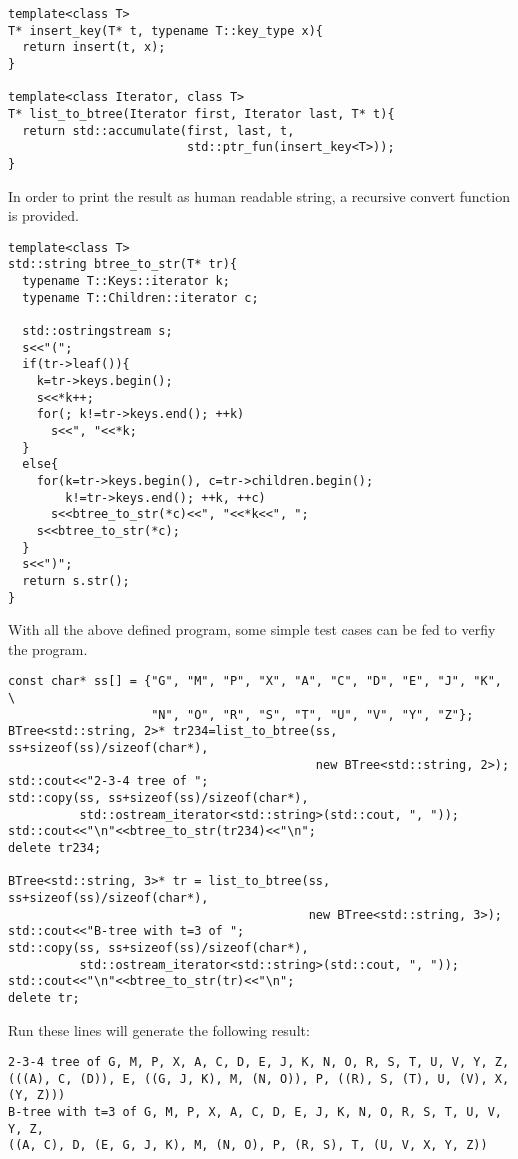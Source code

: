 \documentclass{article}
\begin{document}
\begin{lstlisting}
template<class T>
T* insert_key(T* t, typename T::key_type x){
  return insert(t, x);
}

template<class Iterator, class T>
T* list_to_btree(Iterator first, Iterator last, T* t){
  return std::accumulate(first, last, t,
                         std::ptr_fun(insert_key<T>));
}
\end{lstlisting}

In order to print the result as human readable string, a recursive
convert function is provided.

\begin{lstlisting}
template<class T>
std::string btree_to_str(T* tr){
  typename T::Keys::iterator k;
  typename T::Children::iterator c;

  std::ostringstream s;
  s<<"(";
  if(tr->leaf()){
    k=tr->keys.begin();
    s<<*k++;
    for(; k!=tr->keys.end(); ++k)
      s<<", "<<*k;
  }
  else{
    for(k=tr->keys.begin(), c=tr->children.begin();
        k!=tr->keys.end(); ++k, ++c)
      s<<btree_to_str(*c)<<", "<<*k<<", ";
    s<<btree_to_str(*c);
  }
  s<<")";
  return s.str();
}
\end{lstlisting}

With all the above defined program, some simple test cases can be
fed to verfiy the program.

\begin{lstlisting}
const char* ss[] = {"G", "M", "P", "X", "A", "C", "D", "E", "J", "K", \
                    "N", "O", "R", "S", "T", "U", "V", "Y", "Z"};
BTree<std::string, 2>* tr234=list_to_btree(ss, ss+sizeof(ss)/sizeof(char*),
                                           new BTree<std::string, 2>);
std::cout<<"2-3-4 tree of ";
std::copy(ss, ss+sizeof(ss)/sizeof(char*), 
          std::ostream_iterator<std::string>(std::cout, ", "));
std::cout<<"\n"<<btree_to_str(tr234)<<"\n";
delete tr234;

BTree<std::string, 3>* tr = list_to_btree(ss, ss+sizeof(ss)/sizeof(char*),
                                          new BTree<std::string, 3>);
std::cout<<"B-tree with t=3 of ";
std::copy(ss, ss+sizeof(ss)/sizeof(char*), 
          std::ostream_iterator<std::string>(std::cout, ", "));
std::cout<<"\n"<<btree_to_str(tr)<<"\n";
delete tr;
\end{lstlisting}

Run these lines will generate the following result:

\begin{verbatim}
2-3-4 tree of G, M, P, X, A, C, D, E, J, K, N, O, R, S, T, U, V, Y, Z, 
(((A), C, (D)), E, ((G, J, K), M, (N, O)), P, ((R), S, (T), U, (V), X, (Y, Z)))
B-tree with t=3 of G, M, P, X, A, C, D, E, J, K, N, O, R, S, T, U, V, Y, Z, 
((A, C), D, (E, G, J, K), M, (N, O), P, (R, S), T, (U, V, X, Y, Z))
\end{verbatim}
\end{document}

